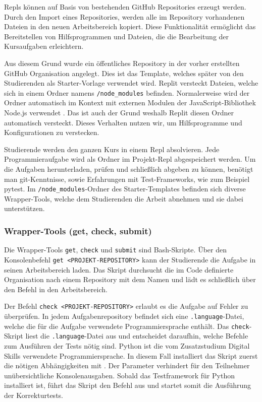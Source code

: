 Repls können auf Basis von bestehenden GitHub Repositories erzeugt werden. Durch
den Import eines Repositories, werden alle im Repository vorhandenen Dateien
in den neuen Arbeitsbereich kopiert. Diese Funktionalität ermöglicht das
Bereitstellen von Hilfsprogrammen und Dateien, die die Bearbeitung der
Kursaufgaben erleichtern.

Aus diesem Grund wurde ein öffentliches Repository in der vorher erstellten
GitHub Organisation angelegt. Dies ist das Template, welches später von den
Studierenden als Starter-Vorlage verwendet wird. Replit versteckt Dateien,
welche sich in einem Ordner namens \texttt{/node\_modules} befinden.
Normalerweise wird der Ordner automatisch im Kontext mit externen Modulen der
JavaScript-Bibliothek Node.js verwendet \parencite{nodejs}. Das ist auch der Grund
weshalb Replit diesen Ordner automatisch versteckt. Dieses Verhalten nutzen wir,
um Hilfsprogramme und Konfigurationen zu verstecken.

Studierende werden den ganzen Kurs in einem Repl absolvieren. Jede
Programmieraufgabe wird als Ordner im Projekt-Repl abgespeichert werden. Um die
Aufgaben herunterladen, prüfen und schließlich abgeben zu können, benötigt
man git-Kenntnisse, sowie Erfahrungen mit Test-Frameworks, wie zum Beispiel 
pytest. Im \texttt{/node\_modules}-Ordner des Starter-Templates befinden sich
diverse Wrapper-Tools, welche dem Studierenden die Arbeit abnehmen und sie dabei
unterstützen.

\subsubsection{Wrapper-Tools (get, check, submit)}
\label{replit-template-wrapper-tools}
Die Wrapper-Tools \texttt{get}, \texttt{check} und \texttt{submit} sind
Bash-Skripte. Über den Konsolenbefehl \texttt{get <PROJEKT-REPOSITORY>} kann der
Studierende die Aufgabe in seinen Arbeitsbereich laden. Das Skript durchsucht
die im Code definierte Organisation nach einem Repository mit dem Namen und
lädt es schließlich über den Befehl  in den Arbeitsbereich.

Der Befehl \texttt{check <PROJEKT-REPOSITORY>} erlaubt es die Aufgabe auf Fehler zu
überprüfen. In jedem Aufgabenrepository befindet sich eine
\texttt{.language}-Datei, welche die für die Aufgabe verwendete
Programmiersprache enthält. Das \texttt{check}-Skript liest die
\texttt{.language}-Datei aus und entscheidet daraufhin, welche Befehle zum
Ausführen der Tests nötig sind. Python ist die vom Zusatzstudium Digital Skills
verwendete Programmiersprache. In diesem Fall installiert das Skript zuerst die
nötigen Abhängigkeiten mit . Der Parameter
 verhindert für den Teilnehmer unübersichtliche Konsolenausgaben.
Sobald das Testframework für Python installiert ist, führt das Skript den Befehl
 aus und startet somit die Ausführung der Korrekturtests.

